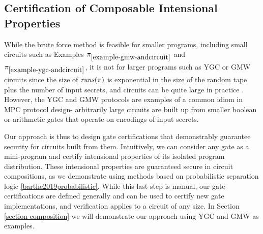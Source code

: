 \subsection{Certification of Composable Intensional Properties}

While the brute force method is feasible for smaller programs,
including small circuits such as Examples
$\pi_{\ref{example-gmw-andcircuit}}$ and
$\pi_{\ref{example-ygc-andcircuit}}$, it is not for larger programs
such as YGC or GMW circuits since the size of $\mathit{runs}(\pi)$ is
exponential in the size of the random tape plus the number of input
secrets, and circuits can be quite large in practice
\cite{kreuter2012billion}.  However, the YGC and GMW protocols are
examples of a common idiom in MPC protocol design- arbitrarily large
circuits are built up from smaller boolean or arithmetic gates that
operate on encodings of input secrets.

Our approach is thus to design gate certifications that demonstrably
guarantee security for circuits built from them. Intuitively, we can
consider any gate as a mini-program and certify intensional properties
of its isolated program distribution. These intensional properties are
guaranteed secure in circuit compositions, as we demonstrate using
methods based on probabilistic separation logic
\ref{barthe2019probabilistic}. While this last step is manual, our
gate certifications are defined generally and can be used to certify
new gate implementations, and verification applies to a circuit of any
size. In Section \ref{section-composition} we will demonstrate our
approach using YGC and GMW as examples.

